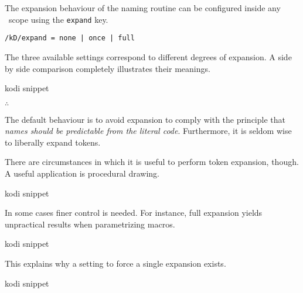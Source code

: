 The expansion behaviour of the naming routine can be configured
inside any \koDi\ scope using the \lstinline!expand! key.

\begin{lstlisting}
/kD/expand = none | once | full
\end{lstlisting}

The three available settings correspond to different degrees of expansion.
A side by side comparison completely illustrates their meanings.

\begin{tcblisting}{kodi snippet}
\end{tcblisting}

\hfill$\therefore$\hfill\null

The default behaviour is to avoid expansion to comply with the principle
that \emph{names should be predictable from the \emph{literal} code}.
Furthermore, it is seldom wise to liberally expand tokens.

There are circumstances in which it is useful to perform token expansion,
though. A useful application is procedural drawing.

\begin{tcblisting}{kodi snippet}
\end{tcblisting}

In some cases finer control is needed. For instance, full expansion
yields unpractical results when parametrizing macros.

\begin{tcblisting}{kodi snippet}
\end{tcblisting}

This explains why a setting to force a single expansion exists.

\begin{tcblisting}{kodi snippet}
\end{tcblisting}
